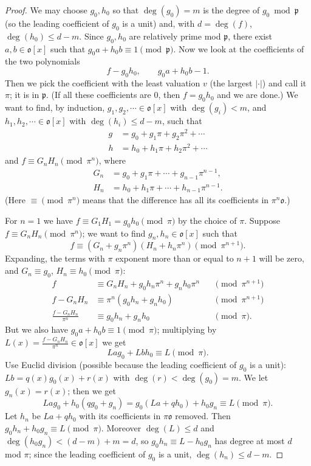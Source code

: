 \documentclass[11pt]{article}
\begin{document}
\begin{proof}
We may choose $g_0, h_0$ so that $\deg(g_0) = m$ is the degree of $g_0 \bmod \mathfrak{p}$ (so the leading coefficient of $g_0$ is a unit) and, with $d = \deg(f)$, $\deg(h_0) \leq d - m$. Since $g_0, h_0$ are relatively prime mod $\mathfrak{p}$, there exist $a, b \in \mathfrak{o}[x]$ such that $g_0 a + h_0 b \equiv 1 \pmod{\mathfrak{p}}$. Now we look at the coefficients of the two polynomials
\[
f - g_0 h_0, \qquad g_0 a + h_0 b - 1 .
\]
Then we pick the coefficient with the least valuation $v$ (the largest $|\cdot|$) and call it $\pi$; it is in $\mathfrak{p}$. (If all these coefficients are $0$, then $f = g_0h_0$ and we are done.) We want to find, by induction, $g_1, g_2, \cdots \in \mathfrak{o}[x]$ with $\deg(g_i) < m$, and $h_1, h_2, \cdots \in \mathfrak{o}[x]$ with $\deg(h_i) \leq d - m$, such that
\[
\begin{aligned}
g &= g_0 + g_1 \pi + g_2 \pi^2 + \cdots \\
h &= h_0 + h_1 \pi + h_2 \pi^2 + \cdots
\end{aligned}
\]
and $f \equiv G_n H_n \pmod{\pi^n}$, where
\[
\begin{aligned}
G_n &= g_0 + g_1\pi + \cdots + g_{n-1}\pi^{n-1}, \\
H_n &= h_0 + h_1\pi + \cdots + h_{n-1}\pi^{n-1}.
\end{aligned}
\]
(Here $\equiv \pmod{\pi^n}$ means that the difference has all its coefficients in $\pi^n\mathfrak{o}$.)

For $n = 1$ we have $f \equiv G_1 H_1 = g_0 h_0 \pmod{\pi}$ by the choice of $\pi$. Suppose $f \equiv G_n H_n \pmod{\pi^n}$; we want to find $g_n, h_n \in \mathfrak{o}[x]$ such that
\[
f \equiv (G_n + g_n\pi^n)(H_n + h_n\pi^n) \pmod{\pi^{n+1}} .
\]
Expanding, the terms with $\pi$ exponent more than or equal to $n+1$ will be zero, and $G_n \equiv g_0$, $H_n \equiv h_0 \pmod \pi$:
\[
\begin{aligned}
f &\equiv G_n H_n + g_0 h_n \pi^n + g_n h_0 \pi^n && \pmod{\pi^{n+1}} \\
f - G_n H_n &\equiv \pi^n (g_0 h_n + g_n h_0) && \pmod{\pi^{n+1}} \\
\frac{f - G_n H_n}{\pi^n} &\equiv g_0 h_n + g_n h_0 && \pmod{\pi} .
\end{aligned}
\]
But we also have $g_0 a + h_0 b \equiv 1 \pmod{\pi}$; multiplying by $L(x) = \frac{f - G_n H_n}{\pi^n} \in \mathfrak{o}[x]$ we get
\[
L a g_0 + L b h_0 \equiv L \pmod{\pi} .
\]
Use Euclid division (possible because the leading coefficient of $g_0$ is a unit): $Lb = q(x) g_0(x) + r(x)$ with $\deg(r) < \deg(g_0) = m$. We let $g_n(x) = r(x)$; then we get
\[
L a g_0 + h_0 (q g_0 + g_n) = g_0 (L a + q h_0) + h_0 g_n \equiv L \pmod{\pi} .
\]
Let $h_n$ be $La + qh_0$ with its coefficients in $\pi\mathfrak{o}$ removed. Then $g_0 h_n + h_0 g_n \equiv L \pmod{\pi}$. Moreover $\deg(L) \leq d$ and $\deg(h_0 g_n) < (d - m) + m = d$, so $g_0 h_n \equiv L - h_0 g_n$ has degree at most $d$ mod $\pi$; since the leading coefficient of $g_0$ is a unit, $\deg(h_n) \leq d - m$.


\end{proof}
\end{document}
